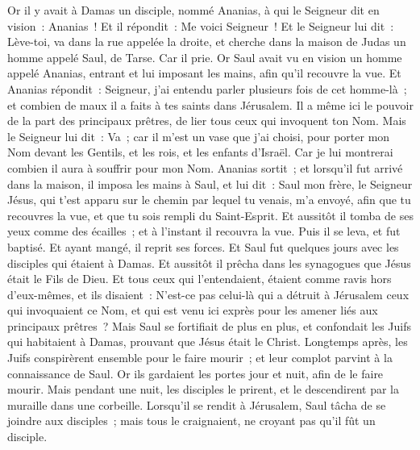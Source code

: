 \begin{multicols}{2}
Or il y avait à Damas un disciple, nommé Ananias, à qui le Seigneur dit en vision~: Ananias~! Et il répondit~: Me voici Seigneur~!
Et le Seigneur lui dit~: Lève-toi, va dans la rue appelée la droite, et cherche dans la maison de Judas un homme appelé Saul, de Tarse.
Car il prie. Or Saul avait vu en vision un homme appelé Ananias, entrant et lui imposant les mains, afin qu'il recouvre la vue. Et Ananias répondit~:
 Seigneur, j'ai entendu parler plusieurs fois de cet homme-là~; et combien de maux il a faits à tes saints dans Jérusalem.
Il a même ici le pouvoir de la part des principaux prêtres, de lier tous ceux qui invoquent ton Nom.
Mais le Seigneur lui dit~: Va~; car il m'est un vase que j'ai choisi, pour porter mon Nom devant les Gentils, et les rois, et les enfants d'Israël.
Car je lui montrerai combien il aura à souffrir pour mon Nom.
Ananias sortit~; et lorsqu'il fut arrivé dans la maison, il imposa les mains à Saul, et lui dit~: Saul mon frère, le Seigneur Jésus, qui t'est apparu sur le chemin par lequel tu venais, m'a envoyé, afin que tu recouvres la vue, et que tu sois rempli du Saint-Esprit.
Et aussitôt il tomba de ses yeux comme des écailles~; et à l'instant il recouvra la vue. Puis il se leva, et fut baptisé.
Et ayant mangé, il reprit ses forces. Et Saul fut quelques jours avec les disciples qui étaient à Damas.
Et aussitôt il prêcha dans les synagogues que Jésus était le Fils de Dieu.
Et tous ceux qui l'entendaient, étaient comme ravis hors d'eux-mêmes, et ils disaient~: N'est-ce pas celui-là qui a détruit à Jérusalem ceux qui invoquaient ce Nom, et qui est venu ici exprès pour les amener liés aux principaux prêtres~?
Mais Saul se fortifiait de plus en plus, et confondait les Juifs qui habitaient à Damas, prouvant que Jésus était le Christ.
Longtemps après, les Juifs conspirèrent ensemble pour le faire mourir~;
et leur complot parvint à la connaissance de Saul. Or ils gardaient les portes jour et nuit, afin de le faire mourir.
Mais pendant une nuit, les disciples le prirent, et le descendirent par la muraille dans une corbeille.
Lorsqu'il se rendit à Jérusalem, Saul tâcha de se joindre aux disciples~; mais tous le craignaient, ne croyant pas qu'il fût un disciple.

\end{multicols}
